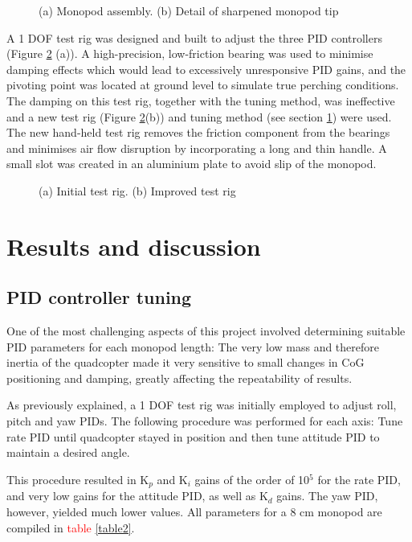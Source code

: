 \documentclass[12pt,a4paper]{article}
\begin{document}
\begin{figure}[h!]
\centering
  \caption{(a) Monopod assembly. (b) Detail of sharpened monopod tip}
  \label{fig5}
\end{figure}

A 1 DOF test rig was designed and built to adjust the three PID controllers (Figure \ref{fig6} (a)). A high-precision, low-friction bearing was used to minimise damping effects which would lead to excessively unresponsive PID gains, and the pivoting point was located at ground level to simulate true perching conditions. The damping on this test rig, together with the tuning method, was ineffective and a new test rig (Figure \ref{fig6}(b)) and tuning method (see section \ref{Results and discussion}) were used. The new hand-held test rig removes the friction component from the bearings and minimises air flow disruption by incorporating a long and thin handle. A small slot was created in an aluminium plate to avoid slip of the monopod.


\begin{figure}[h!]
\centering
  \caption{(a) Initial test rig. (b) Improved test rig}
  \label{fig6}
\end{figure}

\section{Results and discussion} \label{Results and discussion}
\subsection{PID controller tuning}
One of the most challenging aspects of this project involved determining suitable PID parameters for each monopod length: The very low mass and therefore inertia of the quadcopter made it very sensitive to small changes in CoG positioning and damping, greatly affecting the repeatability of results.

As previously explained, a 1 DOF test rig was initially employed to adjust roll, pitch and yaw PIDs. The following procedure was performed for each axis: Tune rate PID until quadcopter stayed in position and then tune attitude PID to maintain a desired angle. 

This procedure resulted in K$_p$ and K$_i$ gains of the order of 10$^5$ for the rate PID, and very low gains for the attitude PID, as well as K$_d$ gains. The yaw PID, however, yielded much lower values. All parameters for a 8 cm monopod are compiled in \textcolor{red}{table \ref{table2}}. 
\end{document}
